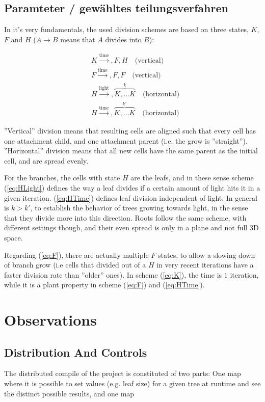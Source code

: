 \documentclass[11pt]{scrartcl}
\begin{document}
\subsection{Paramteter / gewähltes teilungsverfahren}
In it's very fundamentals, the used division schemes are based on three states, $K$, $F$ and $H$ ($A \rightarrow B$ means that $A$ divides into $B$):

\begin{align}
	&K \xrightarrow {\text{time}}, F, H \quad \text{(vertical)} \label{eq:K} \\
	&F \xrightarrow {\text{time}}, F, F \quad \text{(vertical)} \label{eq:F}\\
	&H \xrightarrow {\text{light}}, \overbrace{ K, \ldots K}^{k} \quad \text{(horizontal)}  \label{eq:HLight} \\
	&H \xrightarrow {\text{time}}, \overbrace{ K, \ldots K}^{k'} \quad \text{(horizontal)} \label{eq:HTime}
\end{align}

''Vertical'' division means that resulting cells are aligned such that every cell has one attachment child, and one attachment parent (i.e. the grow is ''straight''). ''Horizontal'' division means that all new cells have the same parent as the initial cell, and are spread evenly.

For the branches, the cells with state $H$ are the leafs, and in these sense scheme (\ref{eq:HLight}) defines the way a leaf divides if a certain amount of light hits it in a given iteration. (\ref{eq:HTime}) defines leaf division independent of light. In general is $k > k'$, to establish the behavior of trees growing towards light, in the sense that they divide more into this direction. Roots follow the same scheme, with different settings though, and their even spread is only in a plane and not full 3D space.

Regarding (\ref{eq:F}), there are actually multiple $F$ states, to allow a slowing down of branch grow (i.e cells that divided out of a $H$ in very recent iterations have a faster division rate than ''older'' ones). In scheme (\ref{eq:K}), the time is $1$ iteration, while it is a plant property in scheme (\ref{eq:F}) and (\ref{eq:HTime}).

\section{Observations}
\subsection{Distribution And Controls}
The distributed compile of the project is constituted of two parts: One map where it is possible to set values (e.g. leaf size) for a given tree at runtime and see the distinct possible results, and one map 
\end{document}
